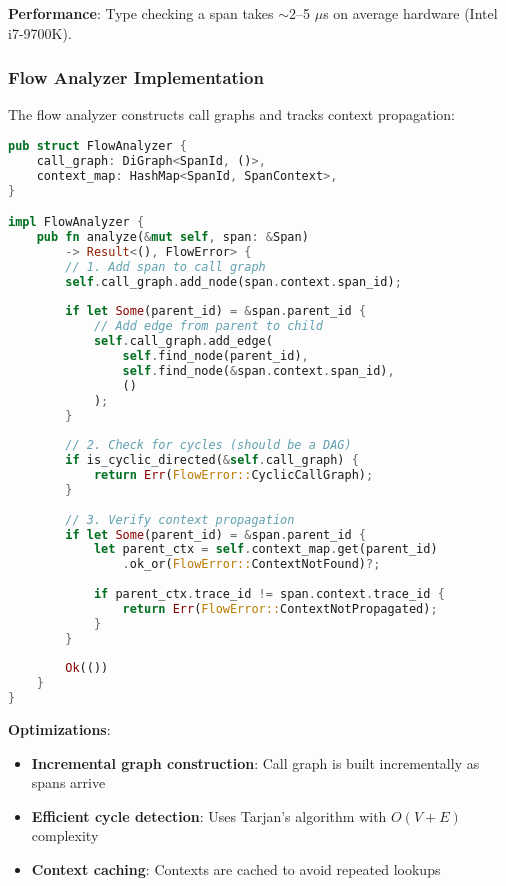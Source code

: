 \textbf{Performance}: Type checking a span takes $\sim$2--5 $\mu$s on average hardware (Intel i7-9700K).

\subsubsection{Flow Analyzer Implementation}

The flow analyzer constructs call graphs and tracks context propagation:

\begin{small}
\begin{lstlisting}[language=Rust]
pub struct FlowAnalyzer {
    call_graph: DiGraph<SpanId, ()>,
    context_map: HashMap<SpanId, SpanContext>,
}

impl FlowAnalyzer {
    pub fn analyze(&mut self, span: &Span) 
        -> Result<(), FlowError> {
        // 1. Add span to call graph
        self.call_graph.add_node(span.context.span_id);
        
        if let Some(parent_id) = &span.parent_id {
            // Add edge from parent to child
            self.call_graph.add_edge(
                self.find_node(parent_id),
                self.find_node(&span.context.span_id),
                ()
            );
        }
        
        // 2. Check for cycles (should be a DAG)
        if is_cyclic_directed(&self.call_graph) {
            return Err(FlowError::CyclicCallGraph);
        }
        
        // 3. Verify context propagation
        if let Some(parent_id) = &span.parent_id {
            let parent_ctx = self.context_map.get(parent_id)
                .ok_or(FlowError::ContextNotFound)?;
            
            if parent_ctx.trace_id != span.context.trace_id {
                return Err(FlowError::ContextNotPropagated);
            }
        }
        
        Ok(())
    }
}
\end{lstlisting}
\end{small}

\textbf{Optimizations}:
\begin{itemize}
\item \textbf{Incremental graph construction}: Call graph is built incrementally as spans arrive
\item \textbf{Efficient cycle detection}: Uses Tarjan's algorithm with $O(V + E)$ complexity
\item \textbf{Context caching}: Contexts are cached to avoid repeated lookups
\end{itemize}


